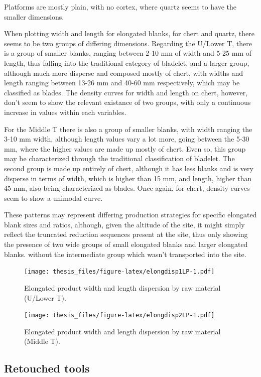 \documentclass[12pt,twoside]{reedthesis}
\begin{document}
Platforms are mostly plain, with no cortex, where quartz seems to have the smaller dimensions.

When plotting width and length for elongated blanks, for chert and quartz, there seems to be two groups of differing dimensions. Regarding the U/Lower T, there is a group of smaller blanks, ranging between 2-10 mm of width and 5-25 mm of length, thus falling into the traditional category of bladelet, and a larger group, although much more disperse and composed mostly of chert, with widths and length ranging between 13-26 mm and 40-60 mm respectively, which may be classified as blades. The density curves for width and length on chert, however, don't seem to show the relevant existance of two groups, with only a continuous increase in values within each variables.

For the Middle T there is also a group of smaller blanks, with width ranging the 3-10 mm width, although length values vary a lot more, going between the 5-30 mm, where the higher values are made up mostly of chert. Even so, this group may be characterized through the traditional classification of bladelet. The second group is made up entirely of chert, although it has less blanks and is very disperse in terms of width, which is higher than 15 mm, and length, higher than 45 mm, also being characterized as blades. Once again, for chert, density curves seem to show a unimodal curve.

These patterns may represent differing production strategies for specific elongated blank sizes and ratios, although, given the altitude of the site, it might simply reflect the truncated reduction sequences present at the site, thus only showing the presence of two wide groups of small elongated blanks and larger elongated blanks. without the intermediate group which wasn't transported into the site.
\begin{figure}
\centering
\texttt{[image: thesis\_files/figure-latex/elongdisp1LP-1.pdf]}
\caption{\label{fig:elongdisp1LP}Elongated product width and length dispersion by raw material (U/Lower T).}
\end{figure}
\begin{figure}
\centering
\texttt{[image: thesis\_files/figure-latex/elongdisp2LP-1.pdf]}
\caption{\label{fig:elongdisp2LP}Elongated product width and length dispersion by raw material (Middle T).}
\end{figure}
\hypertarget{retouched-tools}{%
\subsection{Retouched tools}\label{retouched-tools}}
\end{document}
